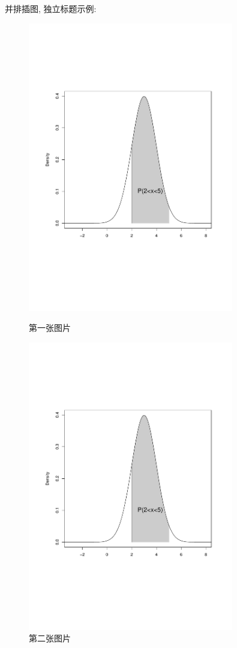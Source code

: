 \documentclass{cosbook}
\begin{document}
并排插图, 独立标题示例:
\begin{figure}[htp]
\begin{minipage}[t]{0.5\linewidth}
\centering
\includegraphics[width=0.80\textwidth]{figure.pdf}
\caption{第一张图片} \label{fig:side:a}
\end{minipage}
\begin{minipage}[t]{0.5\linewidth}
\centering
\includegraphics[width=0.80\textwidth]{figure.pdf}
\caption{第二张图片} \label{fig:side:b}
\end{minipage}
\end{figure}
\end{document}
